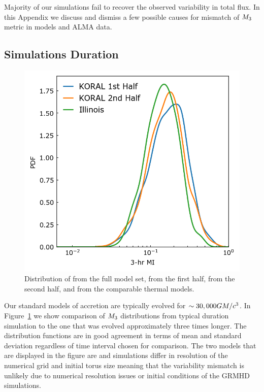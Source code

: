 

Majority of our simulations fail to recover the \sgra observed variability in total flux.  In this Appendix we discuss and dismiss a few possible causes for mismatch of $M_{3}$ metric in models and ALMA data.

\subsection{Simulations Duration}\label{app:narayan}

\begin{figure}
  \centering
  \includegraphics[width=\columnwidth]{./figures/Koral_vs_IL_MI.png}
  \caption{Distribution of  from the full \koral model set, from the first half, from the second half, and from the comparable \kharma thermal models.}
  \label{fig:koral_MI}
\end{figure}

Our standard models of accretion are typically evolved for $\sim 30,000 GM/c^3$. In Figure~\ref{fig:koral_MI} we show comparison of $M_{3}$ distributions from typical duration simulation to the one that was evolved approximately three times longer. The distribution functions are in good agreement in terms of mean and standard deviation regardless of time interval chosen for comparison. The two models that are displayed in the figure are \kharma and \koral simulations differ in resolution of the numerical grid and initial torus size meaning that the variability mismatch is unlikely due to numerical resolution issues or initial conditions of the GRMHD simulations.

